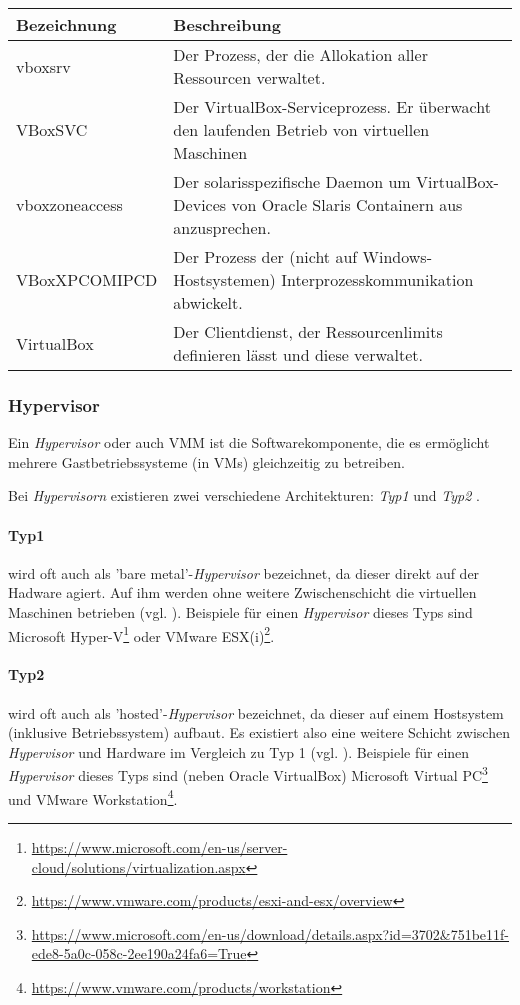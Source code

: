     \begin{tabularx}{\textwidth}{|l||X|}
    \hline
      \textbf{Bezeichnung} & \textbf{Beschreibung} \\
    \hline
    \hline
      vboxsrv & Der Prozess, der die Allokation aller Ressourcen verwaltet. \\
    \hline
    \hline
      VBoxSVC & Der VirtualBox-Serviceprozess. Er überwacht den laufenden Betrieb von virtuellen Maschinen \\
    \hline
    \hline
      vboxzoneaccess & Der solarisspezifische Daemon um VirtualBox-Devices von Oracle Slaris Containern aus anzusprechen. \\
    \hline
    \hline
      VBoxXPCOMIPCD & Der Prozess der (nicht auf Windows-Hostsystemen) Interprozesskommunikation abwickelt. \\
    \hline
    \hline
      VirtualBox & Der Clientdienst, der Ressourcenlimits definieren lässt und diese verwaltet. \\
    \hline
    \end{tabularx}%

\subsubsection{Hypervisor}
\label{subsubsec:hypervisor}
Ein \textit{Hypervisor} oder auch \ac{VMM} ist die Softwarekomponente, die es ermöglicht
mehrere Gastbetriebssysteme (in VMs) gleichzeitig zu betreiben.

Bei \textit{Hypervisorn} existieren zwei verschiedene Architekturen: \textit{Typ1} und
\textit{Typ2} \cite{dash13}.

\paragraph{Typ1} wird oft auch als 'bare metal'-\textit{Hypervisor} bezeichnet, da dieser direkt
auf der Hadware agiert. Auf ihm werden ohne weitere Zwischenschicht die virtuellen Maschinen
betrieben (vgl. ).
Beispiele für einen \textit{Hypervisor} dieses Typs sind Microsoft Hyper-V\footnote{\url{https://www.microsoft.com/en-us/server-cloud/solutions/virtualization.aspx}}
oder VMware ESX(i)\footnote{\url{https://www.vmware.com/products/esxi-and-esx/overview}}.

\paragraph{Typ2} wird oft auch als 'hosted'-\textit{Hypervisor} bezeichnet, da dieser auf
einem Hostsystem (inklusive Betriebssystem) aufbaut. Es existiert also eine weitere Schicht
zwischen \textit{Hypervisor} und Hardware im Vergleich zu Typ 1 (vgl. ).
Beispiele für einen \textit{Hypervisor} dieses Typs sind (neben Oracle VirtualBox) Microsoft
Virtual PC\footnote{\url{https://www.microsoft.com/en-us/download/details.aspx?id=3702&751be11f-ede8-5a0c-058c-2ee190a24fa6=True}} und
VMware Workstation\footnote{\url{https://www.vmware.com/products/workstation}}.

